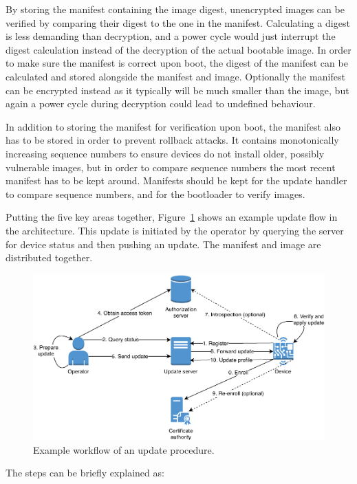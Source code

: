\documentclass[0-thesis.tex]{subfiles}
\begin{document}
By storing the manifest containing the image digest, unencrypted images can be verified by
comparing their digest to the one in the manifest. Calculating a digest is less demanding
than decryption, and a power cycle would just interrupt the digest calculation instead of
the decryption of the actual bootable image. In order to make sure the manifest is correct
upon boot, the digest of the manifest can be calculated and stored alongside the manifest
and image. Optionally the manifest can be encrypted instead as it typically will be much
smaller than the image, but again a power cycle during decryption could lead to undefined
behaviour.

In addition to storing the manifest for verification upon boot, the manifest also has to
be stored in order to prevent rollback attacks. It contains monotonically increasing
sequence numbers to ensure devices do not install older, possibly vulnerable images, but
in order to compare sequence numbers the most recent manifest has to be kept around.
Manifests should be kept for the update handler to compare sequence numbers, and for the
bootloader to verify images.

Putting the five key areas together, Figure~\ref{fig:communication-workflow} shows an
example update flow in the architecture. This update is initiated by the operator by
querying the server for device status and then pushing an update. The manifest and image
are distributed together.

\begin{figure}
    \caption{Example workflow of an update procedure.}
    \label{fig:communication-workflow}
    \includegraphics{images/update-flow.pdf}
\end{figure}

The steps can be briefly explained as:
\end{document}
